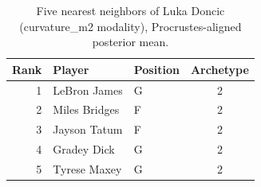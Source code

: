 \begin{table}[htbp]
  \centering\small
  \begin{tabular}{rllc}
    \toprule
    Rank & Player & Position & Archetype \\
    \midrule
    1 & LeBron James & G & 2 \\
    2 & Miles Bridges & F & 2 \\
    3 & Jayson Tatum & F & 2 \\
    4 & Gradey Dick & G & 2 \\
    5 & Tyrese Maxey & G & 2 \\
    \bottomrule
  \end{tabular}
  \caption{Five nearest neighbors of Luka Doncic (curvature_m2 modality), Procrustes-aligned posterior mean.}
  \label{tab:Luka_Doncic_neighbors_curvature_m2}
\end{table}

